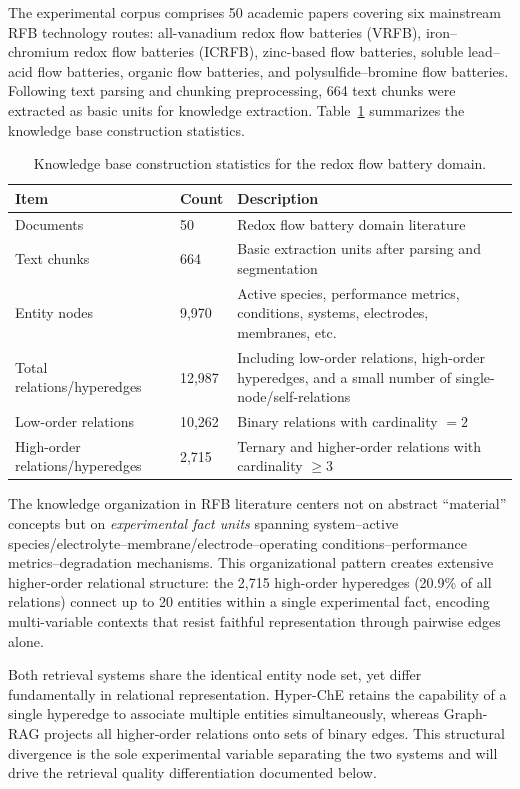 \documentclass[11pt,a4paper]{article}
\begin{document}
The experimental corpus comprises 50 academic papers covering six mainstream RFB technology routes: all-vanadium redox flow batteries (VRFB), iron--chromium redox flow batteries (ICRFB), zinc-based flow batteries, soluble lead--acid flow batteries, organic flow batteries, and polysulfide--bromine flow batteries. Following text parsing and chunking preprocessing, 664 text chunks were extracted as basic units for knowledge extraction. Table~\ref{tab:flow_battery_kb} summarizes the knowledge base construction statistics.

\begin{table}[htbp]
\centering
\caption{Knowledge base construction statistics for the redox flow battery domain.}
\label{tab:flow_battery_kb}
\begin{tabular}{@{}llp{6.5cm}@{}}
\toprule
\textbf{Item} & \textbf{Count} & \textbf{Description} \\
\midrule
Documents & 50 & Redox flow battery domain literature \\
Text chunks & 664 & Basic extraction units after parsing and segmentation \\
Entity nodes & 9,970 & Active species, performance metrics, conditions, systems, electrodes, membranes, etc. \\
Total relations/hyperedges & 12,987 & Including low-order relations, high-order hyperedges, and a small number of single-node/self-relations \\
Low-order relations & 10,262 & Binary relations with cardinality $=2$ \\
High-order relations/hyperedges & 2,715 & Ternary and higher-order relations with cardinality $\geq 3$ \\
\bottomrule
\end{tabular}
\end{table}

The knowledge organization in RFB literature centers not on abstract ``material'' concepts but on \emph{experimental fact units} spanning system--active species/electrolyte--membrane/electrode--operating conditions--performance metrics--degradation mechanisms. This organizational pattern creates extensive higher-order relational structure: the 2,715 high-order hyperedges (20.9\% of all relations) connect up to 20 entities within a single experimental fact, encoding multi-variable contexts that resist faithful representation through pairwise edges alone.

Both retrieval systems share the identical entity node set, yet differ fundamentally in relational representation. Hyper-ChE retains the capability of a single hyperedge to associate multiple entities simultaneously, whereas Graph-RAG projects all higher-order relations onto sets of binary edges. This structural divergence is the sole experimental variable separating the two systems and will drive the retrieval quality differentiation documented below.
\end{document}
